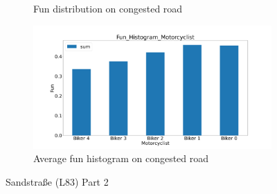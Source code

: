 \begin{figure}[H]
\begin{subfigure}[b]{0.45\textwidth}
		\caption{Fun distribution on congested road}
	\end{subfigure}
	\hfill
	\begin{subfigure}[b]{0.45\textwidth}
		\centering
		\includegraphics[width=1.0\textwidth]{images/Sandstrase/Sandstrase_Fun_Histogram_congested.png}
		\caption{Average fun histogram on congested road}
	\end{subfigure}
	\caption{Sandstraße (L83) Part 2}
\end{figure}

